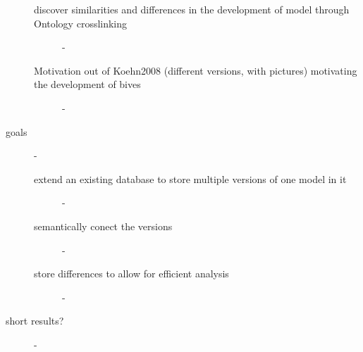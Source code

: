 \begin{description}
\begin{description}
    \item[discover similarities and differences in the development of model through Ontology crosslinking] - 
    \item[Motivation out of Koehn2008 (different versions, with pictures) motivating the development of bives] - 
  \end{description} %
  \item[goals] - 
  \begin{description}
    \item[extend an existing database to store multiple versions of one model in it] - 
    \item[semantically conect the versions] - 
    \item[store differences to allow for efficient analysis] - 
  \end{description} %
  \item[short results?] - 
\end{description} %


